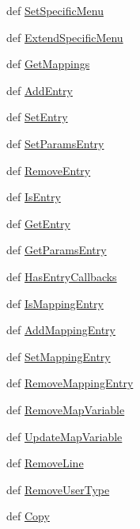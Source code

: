 \begin{CompactItemize}
\item 
def \hyperlink{classnode_1_1Node_da729222acaeb10d8e79a4e94d22602e}{Set\-Specific\-Menu}
\item 
def \hyperlink{classnode_1_1Node_6104f59c483766572db1e78ef59140b2}{Extend\-Specific\-Menu}
\item 
def \hyperlink{classnode_1_1Node_8a9cd8a8392ea36431d1c3d622f9e229}{Get\-Mappings}
\item 
def \hyperlink{classnode_1_1Node_fddc2e825cf7427ddf51f39485fb9d28}{Add\-Entry}
\item 
def \hyperlink{classnode_1_1Node_0584095620f6c553ac66adc114437824}{Set\-Entry}
\item 
def \hyperlink{classnode_1_1Node_68c201e7e4fcd6335b00ac2edd296ebc}{Set\-Params\-Entry}
\item 
def \hyperlink{classnode_1_1Node_c6ddda522758006f1c267cbc410873df}{Remove\-Entry}
\item 
def \hyperlink{classnode_1_1Node_b261871916d7e1a5e2cfdac6af8486d1}{Is\-Entry}
\item 
def \hyperlink{classnode_1_1Node_3ce4e08d5777303266e2b62b2e9c70f8}{Get\-Entry}
\item 
def \hyperlink{classnode_1_1Node_05f269a2d06cb100ecc0ca067beff120}{Get\-Params\-Entry}
\item 
def \hyperlink{classnode_1_1Node_b2d29e5f69151017745d9049435465a9}{Has\-Entry\-Callbacks}
\item 
def \hyperlink{classnode_1_1Node_70ddff5dfe732ec17f4781133ec96cf1}{Is\-Mapping\-Entry}
\item 
def \hyperlink{classnode_1_1Node_dec00c90a5f22d924f2ef430dec759e1}{Add\-Mapping\-Entry}
\item 
def \hyperlink{classnode_1_1Node_3585c494cda4d7eb89361ccd8254c007}{Set\-Mapping\-Entry}
\item 
def \hyperlink{classnode_1_1Node_0caa56ee2a2847bde95a23a0312f3e03}{Remove\-Mapping\-Entry}
\item 
def \hyperlink{classnode_1_1Node_7495c84e9bacd05f5ae653c3a821cf1a}{Remove\-Map\-Variable}
\item 
def \hyperlink{classnode_1_1Node_bd89e1173902b1d4c303a6111723b910}{Update\-Map\-Variable}
\item 
def \hyperlink{classnode_1_1Node_2288996b16df9715706a7414c3e77561}{Remove\-Line}
\item 
def \hyperlink{classnode_1_1Node_f08c254fb41e4e3ef53d9025be396421}{Remove\-User\-Type}
\item 
def \hyperlink{classnode_1_1Node_22f871d92675c482ffe86543ff743937}{Copy}

\end{CompactItemize}
